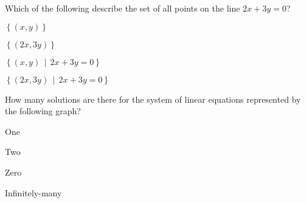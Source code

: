 \begin{readinessAssuranceTest}


%

\item Which of the following describe the set of all points on the line \(2x+3y=0\)?
\begin{multicols}{4}
\begin{readinessAssuranceTestChoices}
\item \(\displaystyle \left\{ (x,y) \right\}\)
\item \(\displaystyle \left\{ (2x,3y) \right\}\)
\item \(\displaystyle \left\{ (x,y) \,\middle|\, 2x+3y=0 \right\}\) %
\item \(\displaystyle \left\{ (2x,3y) \,\middle|\, 2x+3y=0 \right\}\)
\end{readinessAssuranceTestChoices}
\end{multicols}


\item How many solutions are there for the system of linear equations
      represented by the following graph?
    \begin{center}
      \systemWithOneSolutionB[0.23]
    \end{center}

\begin{multicols}{4}
\begin{readinessAssuranceTestChoices}
\item One %
\item Two
\item Zero
\item Infinitely-many
\end{readinessAssuranceTestChoices}
\end{multicols}


\end{readinessAssuranceTest}
